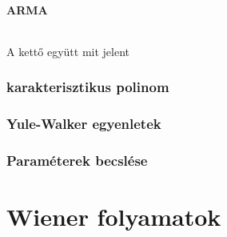 \documentclass[11pt,a4pape,draftr]{article}
\begin{document}
				\subsection{ARMA}
					\paragraph{}
						A kettő együtt mit jelent
			\section{karakterisztikus polinom}
			\section{Yule-Walker egyenletek}
			\section{Paraméterek becslése}
		\part{Wiener folyamatok}
\end{document}

